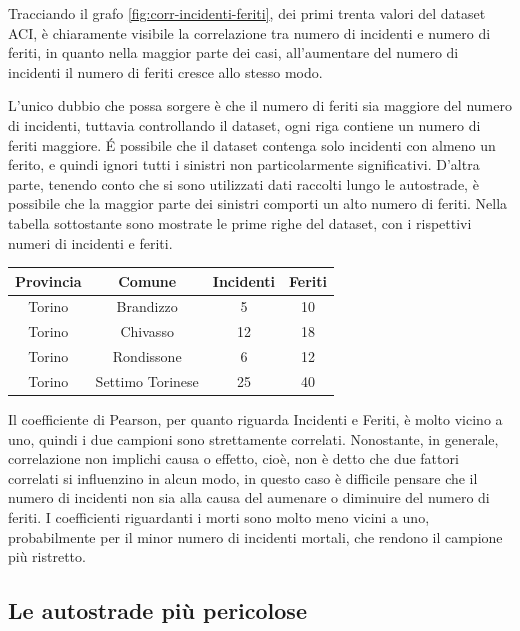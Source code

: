 \documentclass[a4paper]{report}
\begin{document}
Tracciando il grafo \ref{fig:corr-incidenti-feriti}, dei primi trenta valori 
del dataset ACI, è chiaramente visibile la correlazione tra 
numero di incidenti e numero di feriti, in quanto nella maggior parte dei casi, 
all'aumentare del numero di incidenti il numero di feriti cresce allo stesso modo.

L'unico dubbio che possa sorgere è che il numero di feriti sia maggiore del 
numero di incidenti, tuttavia controllando il dataset, ogni 
riga contiene un numero di feriti maggiore.
\'E possibile che il dataset contenga solo incidenti con almeno un ferito, 
e quindi ignori tutti i sinistri non particolarmente significativi.
D'altra parte, tenendo conto che si sono utilizzati dati raccolti lungo 
le autostrade, è possibile che la maggior parte dei sinistri comporti 
un alto numero di feriti. 
Nella tabella sottostante sono  mostrate le prime righe del dataset, con i 
rispettivi numeri di incidenti e feriti. 

\begin{center}
    \def\arraystretch{1.5}%
    \begin{tabular}{ |c|c|c|c| } 
    \hline
    Provincia & Comune & Incidenti & Feriti \\ 
    \hline
    \rowcolor{TableGray}
    Torino & Brandizzo & 5 & 10\\
    Torino & Chivasso & 12 & 18\\
    \rowcolor{TableGray}
    Torino & Rondissone & 6 & 12\\
    Torino & Settimo Torinese & 25 & 40\\
    \hline
    \end{tabular}
\end{center}

Il coefficiente di Pearson, per quanto riguarda Incidenti e Feriti, 
è molto vicino a uno, quindi i due campioni sono strettamente correlati.
Nonostante, in generale, correlazione non implichi causa o effetto, cioè, non 
è detto che due fattori correlati si influenzino in alcun modo, in questo caso è 
difficile pensare che il numero di incidenti non sia alla causa del aumenare o diminuire 
del numero di feriti.
I coefficienti riguardanti i morti sono molto meno vicini a uno, probabilmente 
per il minor numero di incidenti mortali, che rendono il campione più ristretto.

\subsection{Le autostrade più pericolose}
\end{document}
